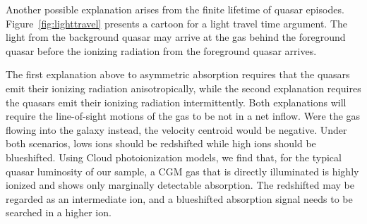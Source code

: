 \documentclass[iop]{emulateapj}
\begin{document}
Another possible explanation arises from the finite lifetime of quasar episodes.
Figure~\ref{fig:lighttravel} presents a cartoon for a light travel time argument. The light from
the background quasar may arrive at the gas behind
the foreground quasar before the ionizing radiation from the foreground quasar arrives.


The first explanation above to asymmetric
absorption requires that the quasars emit their ionizing radiation anisotropically, while the
second explanation requires the quasars emit their ionizing radiation intermittently. Both
explanations will require the line-of-sight motions of the gas to be not in a net inflow.
Were the gas flowing into the galaxy instead, the velocity centroid would be negative.
Under both scenarios, lows ions should be redshifted while high ions should be blueshifted.
Using Cloud photoionization models, we find that, for the typical quasar luminosity of our sample,
a CGM gas that is directly illuminated is highly ionized and shows only marginally detectable
 absorption. The redshifted  may be regarded as an intermediate ion, and a
blueshifted absorption signal needs to be searched in a higher ion.
\end{document}
